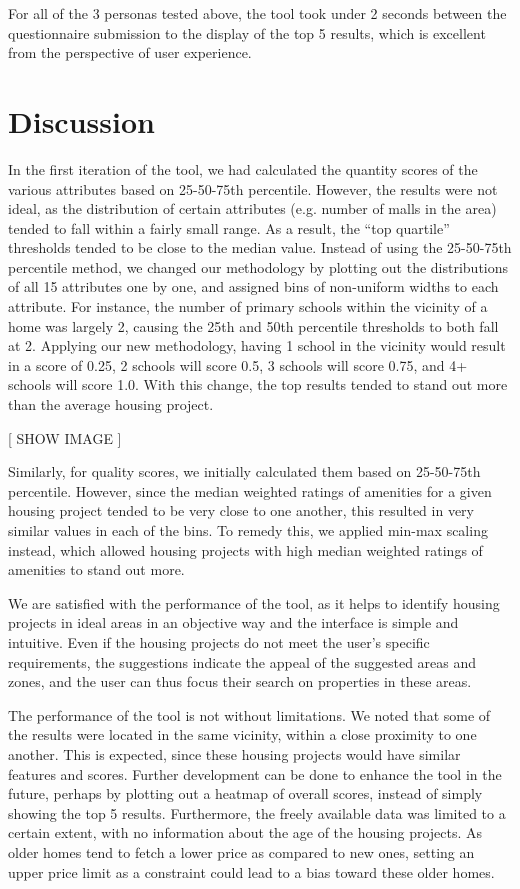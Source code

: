 \documentclass[a4paper, 11pt]{article}
\begin{document}
For all of the 3 personas tested above, the tool took under 2 seconds between the questionnaire submission to the display of the top 5 results, which is excellent from the perspective of user experience.

\section{Discussion}

In the first iteration of the tool, we had calculated the quantity scores of the various attributes based on 25-50-75th percentile. However, the results were not ideal, as the distribution of certain attributes (e.g. number of malls in the area) tended to fall within a fairly small range. As a result, the “top quartile” thresholds tended to be close to the median value. Instead of using the 25-50-75th percentile method, we changed our methodology by plotting out the distributions of all 15 attributes one by one, and assigned bins of non-uniform widths to each attribute. For instance, the number of primary schools within the vicinity of a home was largely 2, causing the 25th and 50th percentile thresholds to both fall at 2. Applying our new methodology, having 1 school in the vicinity would result in a score of 0.25, 2 schools will score 0.5, 3 schools will score 0.75, and 4+ schools will score 1.0. With this change, the top results tended to stand out more than the average housing project.

[ SHOW IMAGE ]

Similarly, for quality scores, we initially calculated them based on 25-50-75th percentile. However, since the median weighted ratings of amenities for a given housing project tended to be very close to one another, this resulted in very similar values in each of the bins. To remedy this, we applied min-max scaling instead, which allowed housing projects with high median weighted ratings of amenities to stand out more.

We are satisfied with the performance of the tool, as it helps to identify housing projects in ideal areas in an objective way and the interface is simple and intuitive. Even if the housing projects do not meet the user’s specific requirements, the suggestions indicate the appeal of the suggested areas and zones, and the user can thus focus their search on properties in these areas. 

The performance of the tool is not without limitations. We noted that some of the results were located in the same vicinity, within a close proximity to one another. This is expected, since these housing projects would have similar features and scores. Further development can be done to enhance the tool in the future, perhaps by plotting out a heatmap of overall scores, instead of simply showing the top 5 results. Furthermore, the freely available data was limited to a certain extent, with no information about the age of the housing projects. As older homes tend to fetch a lower price as compared to new ones, setting an upper price limit as a constraint could lead to a bias toward these older homes.  
\end{document}

